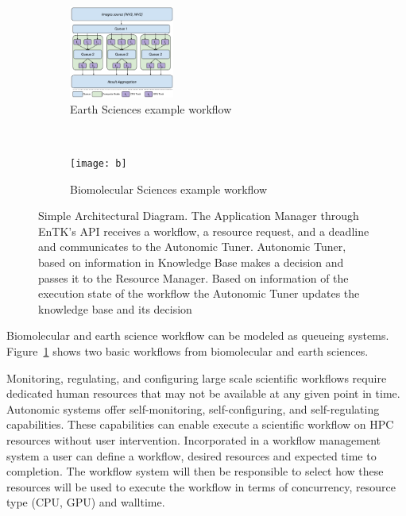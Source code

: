 \begin{figure}[t!]
    \centering
    \begin{subfigure}[t]{0.5\textwidth}
        \centering
        \includegraphics[height=1.2in]{figures/SealsDesign2.pdf}
        \caption{Earth Sciences example workflow}
    \end{subfigure}%
    ~ 
    \begin{subfigure}[t]{0.5\textwidth}
        \centering
        \texttt{[image: b]}
        \caption{Biomolecular Sciences example workflow}
    \end{subfigure}
    \caption{Simple Architectural Diagram. The Application Manager through 
    EnTK's API receives a workflow, a resource request, and a deadline and 
    communicates to the Autonomic Tuner. Autonomic Tuner, based on information 
    in Knowledge Base makes a decision and passes it to the Resource Manager. 
    Based on information of the execution state of the workflow the Autonomic 
    Tuner updates the knowledge base and its decision}\label{fig:bio_earth_workflows}
\end{figure}

Biomolecular and earth science workflow can be modeled as queueing systems. Figure~\ref{fig:bio_earth_workflows} shows two basic workflows from biomolecular and earth sciences.




Monitoring, regulating, and configuring large scale scientific workflows 
require dedicated human resources that may not be available at any given point 
in time. Autonomic systems offer self-monitoring, self-configuring, and 
self-regulating capabilities. These capabilities can enable execute a 
scientific workflow on HPC resources without user intervention. Incorporated in 
a workflow management system a user can define a workflow, desired resources 
and expected time to completion. The workflow system will then be responsible 
to select how these resources will be used to execute the workflow in terms of 
concurrency, resource type (CPU, GPU) and walltime.

